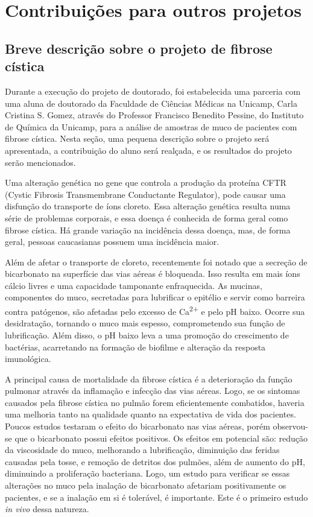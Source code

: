 \part{Contribuições para outros projetos}

	\chapter{Breve descrição sobre o projeto de fibrose cística} 

	Durante a execução do projeto de doutorado, foi estabelecida uma parceria com uma aluna de doutorado da Faculdade de Ciências Médicas na Unicamp, Carla Cristina S. Gomez, através do Professor Francisco Benedito Pessine, do Instituto de Química da Unicamp, para a análise de amostras de muco de pacientes com fibrose cística. Nesta seção, uma pequena descrição sobre o projeto será apresentada, a contribuição do aluno será realçada, e os resultados do projeto serão mencionados.
	
	Uma alteração genética no gene que controla a produção da proteína CFTR (Cystic Fibrosis Transmembrane Conductante Regulator)\cite{Zielenski2000}, pode causar uma disfunção do transporte de íons cloreto.\cite{Quinton2008} Essa alteração genética resulta numa série de problemas corporais, e essa doença é conhecida de forma geral como fibrose cística. Há grande variação na incidência dessa doença, mas, de forma geral, pessoas caucasianas possuem uma incidência maior.\cite{Zielenski2000}
	
	Além de afetar o transporte de cloreto, recentemente foi notado que a secreção de bicarbonato na superfície das vias aéreas é bloqueada.\cite{Quinton2001}  Isso resulta em mais íons cálcio livres e uma capacidade tamponante enfraquecida. As mucinas, componentes do muco, secretadas para lubrificar o epitélio e servir como barreira contra patógenos, são afetadas pelo excesso de Ca\textsuperscript{2+} e pelo pH baixo. Ocorre sua desidratação, tornando o muco mais espesso, comprometendo sua função de lubrificação.\cite{Quinton2008} Além disso, o pH baixo leva a uma promoção do crescimento de bactérias, acarretando na formação de biofilme e alteração da resposta imunológica.\cite{Dorschner2006}
	
	A principal causa de mortalidade da fibrose cística é a deterioração da função pulmonar através da inflamação e infecção das vias aéreas.\cite{Quinton2001} Logo, se os sintomas causados pela fibrose cística no pulmão forem eficientemente combatidos, haveria uma melhoria tanto na qualidade quanto na expectativa de vida dos pacientes. Poucos estudos testaram o efeito do bicarbonato nas vias aéreas, porém observou-se que o bicarbonato possui efeitos positivos.\cite{Stigliani2016} Os efeitos em potencial são: redução da viscosidade do muco, melhorando a lubrificação, diminuição das feridas causadas pela tosse, e remoção de detritos dos pulmões, além de aumento do pH, diminuindo a proliferação bacteriana. Logo, um estudo para verificar se essas alterações no muco pela inalação de bicarbonato afetariam positivamente os pacientes, e se a inalação em si é tolerável, é importante. Este é o primeiro estudo \emph{in vivo} dessa natureza.
	
